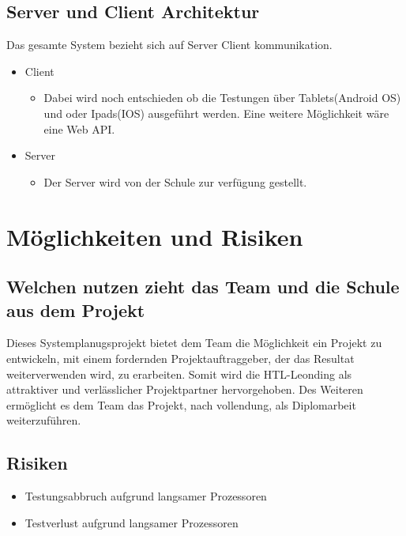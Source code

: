 \documentclass[12pt]{article}
\theoremstyle{definition}
\begin{document}
\subsection{Server und Client Architektur}

Das gesamte System bezieht sich auf Server Client kommunikation.
\newline

\begin{itemize}
\item Client
    \begin{itemize}
	    \item Dabei wird noch entschieden ob die Testungen über Tablets(Android OS) und oder Ipads(IOS) ausgeführt werden. Eine weitere Möglichkeit wäre eine Web API.
    \end{itemize}

\item Server
    \begin{itemize}
	   \item Der Server wird von der Schule zur verfügung gestellt.
	\end{itemize}
\end{itemize}

\pagebreak
\section{Möglichkeiten und Risiken}

\subsection{Welchen nutzen zieht das Team und die Schule aus dem Projekt}

Dieses Systemplanugsprojekt bietet dem Team die Möglichkeit ein Projekt zu entwickeln, mit einem fordernden Projektauftraggeber, der das Resultat weiterverwenden wird, zu erarbeiten.
Somit wird die HTL-Leonding als attraktiver und verlässlicher Projektpartner hervorgehoben.
Des Weiteren ermöglicht es dem Team das Projekt, nach vollendung, als Diplomarbeit weiterzuführen.


\subsection{Risiken}
\begin{itemize}
 \item Testungsabbruch aufgrund langsamer Prozessoren
 \item Testverlust aufgrund langsamer Prozessoren
\end{itemize}
\end{document}
